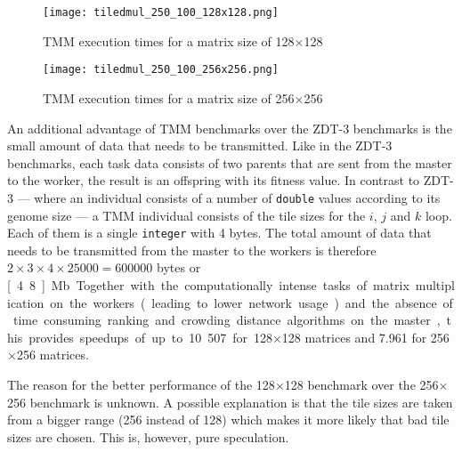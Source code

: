 \begin{figure}
  \centering
  \texttt{[image: tiledmul\_250\_100\_128x128.png]}
  \caption[TMM execution times for a matrix size of 128$\times$128]{TMM execution times for a matrix size of 128$\times$128}
  \label{fig:tiledmul_250_100_128x128}
\end{figure}
\begin{figure}
  \centering
  \texttt{[image: tiledmul\_250\_100\_256x256.png]}
  \caption[TMM execution times for a matrix size of 256$\times$256]{TMM execution times for a matrix size of 256$\times$256}
  \label{fig:tiledmul_250_100_256x256}
\end{figure}

An additional advantage of TMM benchmarks over the ZDT-3 benchmarks is the small amount of data that needs to be transmitted. Like in the ZDT-3 benchmarks, each task data consists of two parents that are sent from the master to the worker, the result is an offspring with its fitness value. In contrast to ZDT-3 --- where an individual consists of a number of \texttt{double} values according to its genome size --- a TMM individual consists of the tile sizes for the $i$, $j$ and $k$ loop. Each of them is a single \texttt{integer} with 4 bytes. The total amount of data that needs to be transmitted from the master to the workers is therefore $2 \times 3 \times 4 \times 25000 = 600000$ bytes or \unit[4.8]{Mb}. Together with the computationally intense tasks of matrix multiplication on the workers (leading to lower network usage) and the absence of time consuming ranking and crowding distance algorithms on the master, this provides speedups of up to 10.507 for 128$\times$128 matrices and 7.961 for 256$\times$256 matrices.

The reason for the better performance of the 128$\times$128 benchmark over the 256$\times$256 benchmark is unknown. A possible explanation is that the tile sizes are taken from a bigger range (256 instead of 128) which makes it more likely that bad tile sizes are chosen. This is, however, pure speculation.


